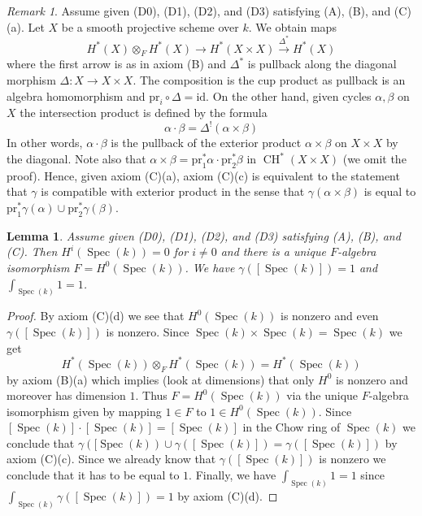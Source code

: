 \documentclass{stacks-project}
\theoremstyle{plain}
\newtheorem{lemma}[subsection]{Lemma}
\theoremstyle{definition}
\theoremstyle{remark}
\newtheorem{remark}[subsection]{Remark}
\numberwithin{equation}{subsection}
\def\Spec{\mathop{\mathrm{Spec}}}
\def\CH{\mathop{\mathrm{CH}}\nolimits}
\begin{document}
\begin{remark}
\label{remark-replace-cup-product}
Assume given (D0), (D1), (D2), and (D3) satisfying (A), (B), and (C)(a).
Let $X$ be a smooth projective scheme over $k$. We obtain maps
$$
H^*(X) \otimes_F H^*(X) \longrightarrow H^*(X \times X)
\xrightarrow{\Delta^*} H^*(X)
$$
where the first arrow is as in axiom (B) and $\Delta^*$
is pullback along the diagonal morphism $\Delta : X \to X \times X$.
The composition is the cup product as pullback is an algebra homomorphism and
$\text{pr}_i \circ \Delta = \text{id}$.
On the other hand, given cycles $\alpha, \beta$ on $X$ 
the intersection product is defined by the formula
$$
\alpha \cdot \beta =
\Delta^!(\alpha \times \beta)
$$
In other words, $\alpha \cdot \beta$ is the pullback of the
exterior product $\alpha \times \beta$ on $X \times X$ by
the diagonal. Note also that
$\alpha \times \beta = \text{pr}_1^*\alpha \cdot \text{pr}_2^*\beta$
in $\CH^*(X \times X)$ (we omit the proof). Hence, given axiom (C)(a),
axiom (C)(c) is equivalent to the statement that $\gamma$ is
compatible with exterior product in the sense that
$\gamma(\alpha \times \beta)$ is equal to
$\text{pr}_1^*\gamma(\alpha) \cup \text{pr}_2^*\gamma(\beta)$.
\end{remark}

\begin{lemma}
\label{lemma-base}
Assume given (D0), (D1), (D2), and (D3) satisfying (A), (B), and (C).
Then $H^i(\Spec(k)) = 0$ for $i \not = 0$ and there is a
unique $F$-algebra isomorphism $F = H^0(\Spec(k))$.
We have $\gamma([\Spec(k)]) = 1$ and $\int_{\Spec(k)} 1 = 1$.
\end{lemma}

\begin{proof}
By axiom (C)(d) we see that $H^0(\Spec(k))$ is nonzero and even
$\gamma([\Spec(k)])$ is nonzero.
Since $\Spec(k) \times \Spec(k) = \Spec(k)$ we get
$$
H^*(\Spec(k)) \otimes_F H^*(\Spec(k)) = H^*(\Spec(k))
$$
by axiom (B)(a) which implies (look at dimensions) that only
$H^0$ is nonzero and moreover has dimension $1$. Thus
$F = H^0(\Spec(k))$ via the unique $F$-algebra isomorphism
given by mapping $1 \in F$ to $1 \in H^0(\Spec(k))$.
Since $[\Spec(k)] \cdot [\Spec(k)] = [\Spec(k)]$ in the
Chow ring of $\Spec(k)$ we conclude that
$\gamma([\Spec(k)) \cup \gamma([\Spec(k)]) = \gamma([\Spec(k)])$
by axiom (C)(c). Since we already know that $\gamma([\Spec(k)])$ is nonzero
we conclude that it has to be equal to $1$.
Finally, we have $\int_{\Spec(k)} 1 = 1$ since
$\int_{\Spec(k)} \gamma([\Spec(k)]) = 1$
by axiom (C)(d).
\end{proof}
\end{document}
